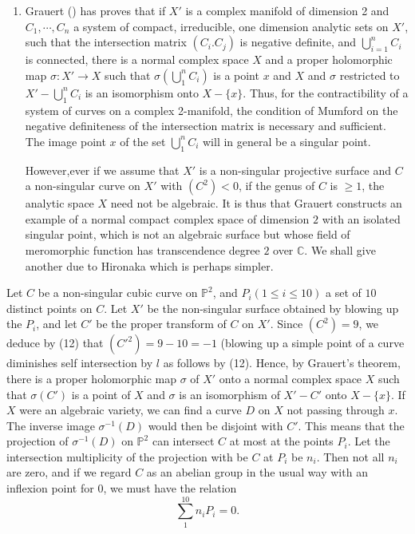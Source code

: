 \begin{remark*}
\begin{enumerate}
  \item Grauert (\cite{key5}) has proves that if $X'$
    is a complex manifold of dimension  2 and  $C_1, \cdots ,C_n$ a
    system of compact, irreducible, one dimension analytic sets on $X'$,
    such that the intersection matrix $(C_i. C_j)$ is negative definite,
    and $\bigcup \limits_{i=1}^n C_i$ is connected, there is a normal
    complex space $X$ and a proper holomorphic  map  $\sigma : X' \to X$
    such that $\sigma( \bigcup \limits_1^n C_i)$ is a point $x$ and $X$
    and $\sigma$ restricted to $X'- \bigcup \limits_1^n C_i$ is an
    isomorphism onto $X- \{x\}$. Thus, for the contractibility of a
    system of curves on a complex 2-manifold, the condition of Mumford on
    the negative definiteness of the intersection matrix is necessary and
    sufficient. The image point $x$ of the set  $\bigcup \limits_1^n C_i$
    will in general be a singular point. 
    
    However,\pageoriginale ever if we assume that $X'$ is a non-singular
    projective surface and $C$ a non-singular curve on $X'$ with
    $(C^2)<0$, if the genus of $C$ is $\ge 1$, the analytic space $X$
    need not be algebraic. It is thus that Grauert constructs an example
    of a normal compact complex space of dimension $2$ with an isolated
    singular point, which is not an algebraic surface but whose field of
    meromorphic function has transcendence degree $2$ over
    $\mathbb{C}$. We shall give another due to Hironaka which is perhaps
    simpler. 
\end{enumerate}
\end{remark*}

 Let $C$ be a non-singular cubic curve on $\mathbb{P}^2$, and  $P_i(1
 \le i \le 10)$ a set of $10$ distinct points on $C$. Let $X'$ be the
 non-singular surface obtained by blowing  up the $P_i$, and let $C'$
 be the proper transform of $C$ on $X'$. Since $(C^2)=9$, we deduce by
 (12) that $(C'^{2})=9-10=-1$ (blowing up a simple point of a
 curve  diminishes self intersection by $l$ as follows by
 (12). Hence, by Grauert's theorem, there is a proper holomorphic
 map $\sigma $ of $X'$ onto a normal complex space $X$ such that
 $\sigma (C')$ is a point of $X$ and $\sigma$ is an isomorphism of $X'
 - C'$ onto  $X- \{x\}$. If $X$ were an algebraic variety, we can find
 a curve $D$ on $X$ not passing through $x$. The inverse image
 $\sigma^{-1}(D)$ would then be disjoint with $C'$.  This means that
 the projection of  $\sigma^{-1}(D)$ on $\mathbb{P}^2$ can intersect
 $C$ at most at the points  $P_i$. Let the intersection multiplicity
 of the projection with be $C$ at $P_i$ be $n_i$. Then not all $n_i$
 are zero, and if we regard  $C$ as an abelian group in the usual way
 with an inflexion point for $0$, we must have the relation  
 $$
 \sum_1^{10} n_i P_i =0.
 $$   

